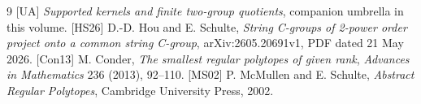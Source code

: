 \begin{thebibliography}{9}
[UA] \emph{Supported kernels and finite two-group quotients},
companion umbrella in this volume.
[HS26] D.-D. Hou and E. Schulte,
\emph{String C-groups of 2-power order project onto a common string C-group},
arXiv:2605.20691v1, PDF dated 21 May 2026.
[Con13] M. Conder, \emph{The smallest regular polytopes of
given rank}, \emph{Advances in Mathematics} 236 (2013), 92--110.
[MS02] P. McMullen and E. Schulte,
\emph{Abstract Regular Polytopes}, Cambridge University Press, 2002.
\end{thebibliography}

